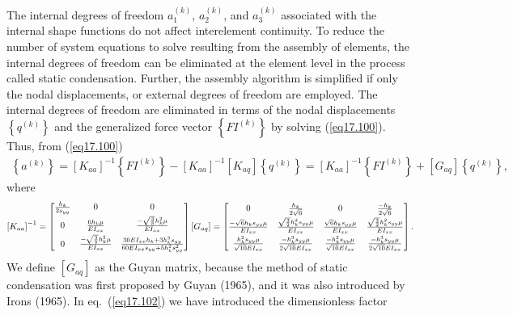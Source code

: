 \documentclass{AeroStructure-ERJohnson}
\begin{document}
The internal degrees of freedom $a_{1}^{(k)}$, $a_{2}^{(k)}$, and $a_{3}^{(k)}$ associated with the internal shape functions do not affect interelement continuity. To reduce the number of system equations to solve resulting from the assembly of elements, the internal degrees of freedom can be eliminated at the element level in the process called static condensation. Further, the assembly algorithm is simplified if only the nodal displacements, or external degrees of freedom are employed. The internal degrees of freedom are eliminated in terms of the nodal displacements $\left\{q^{(k)}\right\}$ and the generalized force vector $\left\{F I^{(k)}\right\}$ by solving (\ref{eq17.100}). Thus, from (\ref{eq17.100})
\begin{align}\label{eq17.101}
\left\{a^{(k)}\right\}=\left[K_{a a}\right]^{-1}\left\{F I^{(k)}\right\}-\left[K_{a a}\right]^{-1}\left[K_{a q}\right]\left\{q^{(k)}\right\}=\left[K_{a a}\right]^{-1}\left\{F I^{(k)}\right\}+\left[G_{a q}\right]\left\{q^{(k)}\right\},
\end{align}
where
\begin{align}\label{eq17.102}
\left[K_{a a}\right]^{-1}
=\left[\begin{array}{@{}ccc@{}}
\frac{h_{k}}{2 s_{y y}} & 0 & 0 \\[4pt]
0 & \frac{6 h_{k} \mu}{E I_{x x}} & \frac{-\sqrt{\frac{3}{5}} h_{k}^{2} \mu}{E I_{x x}} \\[4pt]
0 & \frac{-\sqrt{\frac{3}{5}} h_{k}^{2} \mu}{E I_{x x}} & \frac{30 E I_{x x} h_{k}+3 h_{k}^{3} s_{y y}}{60 E I_{x x} s_{y y}+5 h_{k}^{2} s_{y y}^{2}}\end{array}\right] \left[G_{a q}\right]
=\left[\begin{array}{@{}cccc@{}}
0 & \frac{h_{k}}{2 \sqrt{6}} & 0 & \frac{-h_{k}}{2 \sqrt{6}} \\[4pt]
\frac{-\sqrt{6} h_{k} s_{y y} \mu}{E I_{x x}} & \frac{\sqrt{\frac{3}{2}} h_{k}^{2} s_{y y} \mu}{E I_{x x}} & \frac{\sqrt{6} h_{k} s_{y y} \mu}{E I_{x x}} & \frac{\sqrt{\frac{3}{2}} h_{k}^{2} s_{y y} \mu}{E I_{x x}} \\[4pt]
\frac{h_{k}^{2} s_{y y} \mu}{\sqrt{10} E I_{x x}} & \frac{-h_{k}^{3} s_{y y} \mu}{2 \sqrt{10} E I_{x x}} & \frac{-h_{k}^{2} s_{y y} \mu}{\sqrt{10} E I_{x x}} & \frac{-h_{k}^{3} s_{y y} \mu}{2 \sqrt{10} E I_{x x}}\end{array}\right].
\end{align}
We define $\left[G_{aq}\right]$ as the Guyan matrix, because the method of static condensation was first proposed by Guyan (1965), and it was also introduced by Irons (1965). In eq.~(\ref{eq17.102}) we have introduced the dimensionless factor
\end{document}
